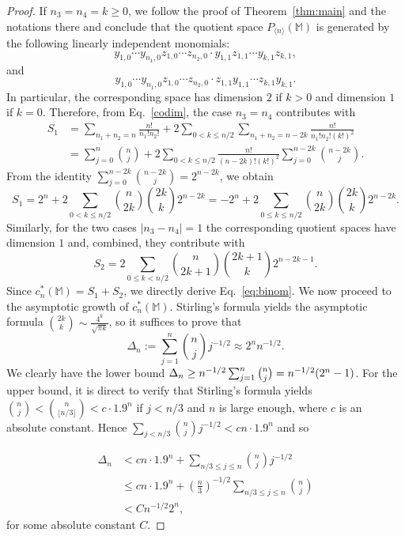 \documentclass[11pt]{amsart}
\theoremstyle{definition}
\theoremstyle{remark}
\begin{document}
\begin{proof}
		If $n_3=n_4=k\ge 0$, we follow the proof of Theorem~\ref{thm:main} and the notations there and conclude that the quotient space $P_{\langle n\rangle}(\mathbb M)$ is generated by the following linearly independent monomials:
		$$y_{1, 0}\cdots y_{n_1, 0}z_{1, 0}\cdots z_{n_2, 0}\cdot y_{1, 1}z_{1, 1}\cdots y_{k, 1}z_{k, 1},$$
        and
        $$y_{1, 0}\cdots y_{n_1, 0}z_{1, 0}\cdots z_{n_2, 0}\cdot z_{1, 1}y_{1, 1}\cdots z_{k, 1}y_{k, 1}.$$ In particular, the corresponding space has dimension $2$ if $k>0$ and dimension $1$ if $k=0$. Therefore, from Eq.~\eqref{codim}, the case $n_3=n_4$ contributes with
		\begin{align*}
			S_1 &=\sum_{n_1+n_2=n}\frac{n!}{n_1!n_2!}+2\sum_{0< k\le n/2}\sum_{n_1+n_2=n-2k}\frac{n!}{n_1!n_2!(k!)^2}\\&=\sum_{j=0}^n\binom{n}{j}+2\sum_{0< k\le n/2}\frac{n!}{(n-2k)!(k!)^2}\sum_{j=0}^{n-2k} \binom{n-2k}{j}.    
		\end{align*}
		From the identity $\sum_{j=0}^{n-2k} \binom{n-2k}{j}=2^{n-2k}$, we obtain
		$$S_1=2^n+2\sum_{0< k\le n/2}\binom{n}{2k}\binom{2k}{k}2^{n-2k}=-2^n+2\sum_{0\le k\le n/2}\binom{n}{2k}\binom{2k}{k}2^{n-2k}.$$
		Similarly, for the two cases $|n_3-n_4|= 1$ the corresponding quotient spaces have dimension $1$ and, combined, they contribute with 
		$$S_2=2\sum_{0\le k<n/2}\binom{n}{2k+1}\binom{2k+1}{k}2^{n-2k-1}.$$
		Since $c_n^*(\mathbb M)=S_1+S_2$, we directly derive Eq.~\eqref{eq:binom}. We now proceed to the asymptotic growth of $c_n^*(\mathbb M)$. Stirling's formula yields the asymptotic formula $\binom{2k}{k}\sim \frac{4^k}{\sqrt{\pi k}}$, so it suffices to prove that
		$$\Delta_n:=\sum_{j=1}^n\binom{n}{j}j^{-1/2}\approx  2^nn^{-1/2}.$$
		We clearly have the lower bound $\Delta_n\ge n^{-1/2}\sum_{j=1}^n\tbinom{n}{j}=n^{-1/2}(2^n-1)$. For the upper bound, it is direct to verify that
		Stirling's formula yields $\binom{n}{j}<\binom{n}{\lfloor n/3\rfloor}<c\cdot 1.9^n$ if $j<n/3$ and $n$ is large enough, where $c$ is an absolute constant. Hence $\sum_{j<n/3}\binom{n}{j}j^{-1/2}<cn\cdot 1.9^n$ and so
		
		\begin{align*}
		\Delta_n &<cn \cdot 1.9^n+ \sum_{n/3\le j\le n}\binom{n}{j}j^{-1/2}\\ {} &\le  cn\cdot1.9^n+\left(\frac{n}{3}\right)^{-1/2}\sum_{n/3\le j\le n}\binom{n}{j}
        \\ {} &< Cn^{-1/2}2^n,\end{align*}
		for some absolute constant $C$. 
	\end{proof}
\end{document}
